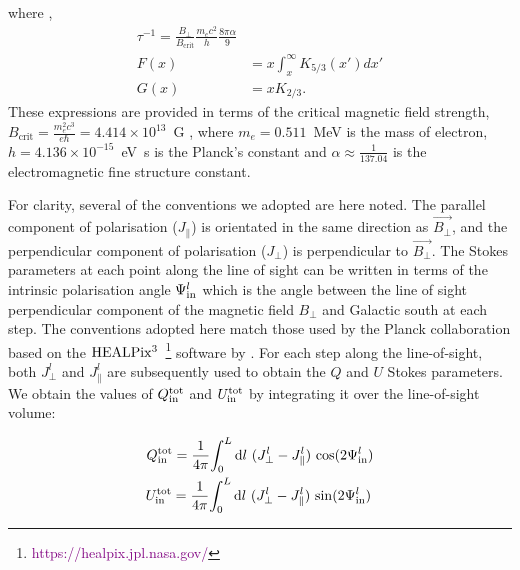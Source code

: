 \documentclass[usenatbib]{mnras}
\newcommand{\Andrew}[1]{\textcolor{dg}{#1}}
\begin{document}
where ,
\begin{align}
\tau^{-1} = \frac{B_{\perp}}{B_{\mathrm{crit}}}\frac{m_{e}c^{2}}{h} \frac{8\pi \alpha}{9}
\\
F(x) &= x \int_x^\infty K_{5/3}(x') dx'\\
G(x) &= x K_{2/3}.
\end{align}
These expressions are provided in terms of the critical magnetic field strength, $B_{\mathrm{crit}} = \frac{m_e^2c^3}{e\hbar} = 4.414 \times 10^{13}$~G , where $m_e = 0.511$~MeV is the mass of electron, $h = 4.136 \times 10^{-15}$~eV~s is the Planck's constant and $\alpha \approx \frac{1}{137.04}$ is the electromagnetic fine structure constant.


For clarity, several of the conventions we adopted are here noted. The parallel component of polarisation (${J_{\parallel}}$) is orientated in the same direction as  $\vec{B_{\perp}}$, and the perpendicular component of polarisation (${J_{\perp}}$) is perpendicular to $\vec{B_{\perp}}$. The Stokes parameters at each point along the line of sight can be written in terms of the intrinsic polarisation angle $\Psi^l_{\rm in}$ which is the angle between the line of sight perpendicular component of the magnetic field $B_{\perp}$ and Galactic south at each step. The conventions adopted here match those used by the Planck collaboration \cite{Planck_XIX} based on the $\rm HEALPix^3$~\footnote{\textcolor{purple}{https://healpix.jpl.nasa.gov/}} software by \cite{Healpix_2005}. For each step along the line-of-sight, both  ${J_{\perp}^l}$ and ${J_{\parallel}^l}$ are subsequently used to obtain the $Q$ and $U$ Stokes parameters. We obtain the values of $Q^{\rm tot}_{\rm in}$ and $U^{\rm tot}_{\rm in}$ by integrating it over the line-of-sight volume:

\begin{eqnarray}
Q_{\rm in}^{\rm tot} = \frac{1}{4\pi} {\int_0^L \mathrm{d}l \ ({J_{\perp}^l} - J_{\parallel}^l) \ {\cos}(2\Psi^l_{\rm in}) } \\
U_{\rm in}^{\rm tot} =\frac{1}{4\pi} {\int_0^L \mathrm{d}l \ ({J_{\perp}^l} - J_{\parallel}^l) \ {\sin}(2\Psi^l_{\rm in})} \,
\end{eqnarray}
\end{document}
